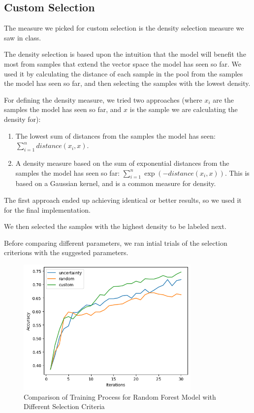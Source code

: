 \documentclass[12pt]{article}
\begin{document}
\subsection{Custom Selection}

The measure we picked for custom selection is the density selection measure we saw in class.

The density selection is based upon the intuition that the model will benefit the most from samples that extend the vector space the model has seen so far. We used it by calculating the distance of each sample in the pool from the samples the model has seen so far, and then selecting the samples with the lowest density.

For defining the density measure, we tried two approaches (where $x_i$ are the samples the model has seen so far, and $x$ is the sample we are calculating the density for):

\begin{enumerate}
    \item The lowest sum of distances from the samples the model has seen: $ \sum_{i=1}^{n} distance(x_i, x) $.
    \item A density measure based on the sum of exponential distances from the samples the model has seen so far: $ \sum_{i=1}^{n} \exp(-distance(x_i, x)) $.
    This is based on a Gaussian kernel, and is a common measure for density.
\end{enumerate}
The first approach ended up achieving identical or better results, so we used it for the final implementation.

We then selected the samples with the highest density to be labeled next.

Before comparing different parameters, we ran intial trials of the selection criterions with the suggested parameters.

\begin{figure}[H]
    \centering
    \includegraphics[width=0.8\textwidth]{random_forest_train.png}
    \caption{Comparison of Training Process for Random Forest Model with Different Selection Criteria}
\end{figure}
\end{document}
